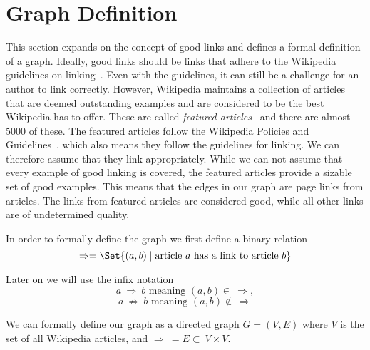 \section{Graph Definition}
This section expands on the concept of good links and defines a formal definition of a graph. Ideally, good links should be links that adhere to the Wikipedia guidelines on linking~\cite{wiki-manual-of-style-guidelines}. Even with the guidelines, it can still be a challenge for an author to link correctly. However, Wikipedia maintains a collection of articles that are deemed outstanding examples and are considered to be the best Wikipedia has to offer. These are called \emph{featured articles}~\cite{wiki-featured-articles} and there are almost 5000 of these. The featured articles follow the Wikipedia Policies and Guidelines~\cite{wiki-editor-guidelines}, which also means they follow the guidelines for linking. We can therefore assume that they link appropriately. While we can not assume that every example of good linking is covered, the featured articles provide a sizable set of good examples. This means that the edges in our graph are page links from articles. The links from featured articles are considered good, while all other links are of undetermined quality.

In order to formally define the graph we first define a binary relation $$\Rightarrow = \Set{(a,b) \mid \text{article } a \text{ has a link to article } b}$$

Later on we will use the infix notation $$a\ \Rightarrow\ b \text{ meaning } (a,b) \in\ \Rightarrow,$$ $$a\ \not\Rightarrow\ b \text{ meaning } (a,b) \not\in\ \Rightarrow$$

We can formally define our graph as a directed graph $G = (V,E)$ where $V$ is the set of all Wikipedia articles, and $\Rightarrow\ = E\subset\ V \times V$.

